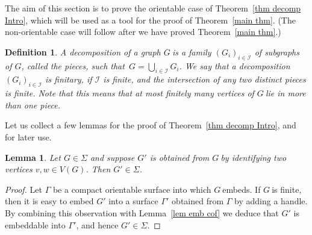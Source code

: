 \documentclass{article}
\newcommand{\Sig}{\ensuremath{\Sigma}}
\newcommand{\defi}[1]{{\color{darkgray}\emph{#1}}}
\newtheorem{definition}[proposition]{Definition}
\newtheorem{lemma}[proposition]{Lemma}
\newcommand{\ci}{\ensuremath{\mathcal I}}
\newcommand{\g}{\ensuremath{G\ }}
\newcommand{\G}{\ensuremath{G}}
\newcommand{\Lr}[1]{Lemma~\ref{#1}}
\newcommand{\Tr}[1]{Theorem~\ref{#1}}
\newcommand{\st}{such that}
\begin{document}
The aim of this section is to prove the orientable case of \Tr{thm decomp Intro}, which will be used as a tool for the proof of \Tr{main thm}. (The non-orientable case will follow after we have proved \Tr{main thm}.)

\begin{definition} \label{def fin dec}
A \defi{decomposition} of a graph \g is a family $(G_i)_{i\in \ci}$ of subgraphs of \G, called the \defi{pieces}, \st\ $G= \bigcup_{i\in \ci} G_i$. We say that a decomposition $(G_i)_{i\in \ci}$ is \defi{finitary}, if $\ci$ is finite, and the intersection of any two distinct pieces is finite. Note that this means that at most finitely many vertices of \g lie in more than one piece.
\end{definition}

Let us collect a few lemmas for the proof of \Tr{thm decomp Intro}, and for later use. 

\begin{lemma} \label{lem S}
Let  $G \in \Sig$ and suppose $G'$ is obtained from \g by identifying two vertices $v,w\in V(G)$. Then $G' \in \Sig$.
\end{lemma}
\begin{proof}
Let $\Gamma$ be a compact orientable surface into which \g embeds. If \g is finite, then it is easy to embed $G'$ into a surface $\Gamma'$ obtained from $\Gamma$ by adding a handle. By combining this observation with \Lr{lem emb cof} we deduce that $G'$ is embeddable into $\Gamma'$, and hence $G' \in \Sig$.
\end{proof}
\end{document}
